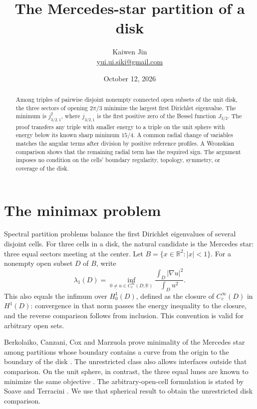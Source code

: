 \documentclass[11pt]{article}
\title{The Mercedes-star partition of a disk}
\author{Kaiwen Jin\\\small\href{mailto:yui.ui.siki@gmail.com}{yui.ui.siki@gmail.com}}
\date{October 12, 2026}
\newcommand{\R}{\mathbb R}
\begin{document}
\maketitle
\begin{abstract}
Among triples of pairwise disjoint nonempty connected open subsets of the
unit disk, the three sectors of opening $2\pi/3$ minimize the largest first
Dirichlet eigenvalue. The minimum is $j_{3/2,1}^2$, where $j_{3/2,1}$ is
the first positive zero of the Bessel function $J_{3/2}$.
The proof transfers any triple with smaller energy to a triple on the unit
sphere with energy below its known sharp minimum $15/4$. A common radial
change of variables matches the angular terms after division by positive
reference profiles. A Wronskian comparison shows that the remaining radial
term has the required sign. The argument imposes no condition on the cells'
boundary regularity, topology, symmetry, or coverage of the disk.
\end{abstract}

\section{The minimax problem}
Spectral partition problems balance the first Dirichlet eigenvalues of
several disjoint cells. For three cells in a disk, the natural candidate is
the Mercedes star: three equal sectors meeting at the center.
Let $B=\{x\in\R^2:|x|<1\}$. For a nonempty open subset $D$ of $B$, write
\begin{equation}\label{eq:rayleigh}
 \lambda_1(D)=\inf_{0\ne u\in C_c^\infty(D;\R)}
                  \frac{\int_D|\nabla u|^2}{\int_Du^2}.
\end{equation}
This also equals the infimum over $H_0^1(D)$, defined as the closure of
$C_c^\infty(D)$ in $H^1(D)$: convergence in that norm passes the energy
inequality to the closure, and the reverse comparison follows from inclusion.
This convention is valid for arbitrary open sets.

Berkolaiko, Canzani, Cox and Marzuola prove minimality of the Mercedes star
among partitions whose boundary contains a curve from the origin to the
boundary of the disk \cite[Theorem~1.8]{BCCM}. The unrestricted class also
allows interfaces outside that comparison. On the unit sphere, in contrast,
the three equal lunes are known to minimize the same objective
\cite[Theorem~1.1 and (1.9)]{HHT}. The arbitrary-open-cell formulation is
stated by Soave and Terracini \cite[Definition~1 and Theorem~1.10]{ST}.
We use that spherical result to obtain the unrestricted disk comparison.
\end{document}
